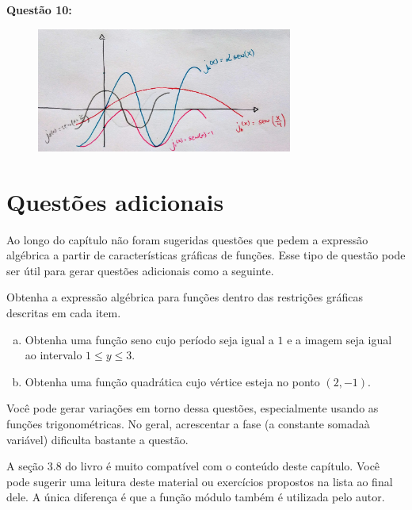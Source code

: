 \documentclass[main_estudante.tex]{subfiles}
\begin{document}
\noindent\textbf{Questão 10:}

\begin{figure}[h]
\centering
\includegraphics[width=0.75\textwidth]{./img/c7g10.jpg}
\end{figure}

\section{Questões adicionais}

Ao longo do capítulo não foram sugeridas questões que pedem a expressão algébrica a partir de características gráficas de funções. Esse tipo de questão pode ser útil para gerar questões adicionais como a seguinte.

\begin{questao}
Obtenha a expressão algébrica para funções dentro das restrições gráficas descritas em cada item.
\begin{enumerate}[a)]
\item Obtenha uma função seno cujo período seja igual a $1$ e a imagem seja igual ao intervalo $1 \leq y \leq 3$.
\item Obtenha uma função quadrática cujo vértice esteja no ponto $(2,-1)$.
\end{enumerate}
\end{questao}

Você pode gerar variações em torno dessa questões, especialmente usando as funções trigonométricas. No geral, acrescentar a fase (a constante somadaà variável) dificulta bastante a questão.

A seção 3.8 do livro  é muito compatível com o conteúdo deste capítulo. Você pode sugerir uma leitura deste material ou exercícios propostos na lista ao final dele. A única diferença é que a função módulo também é utilizada pelo autor.
\end{document}
